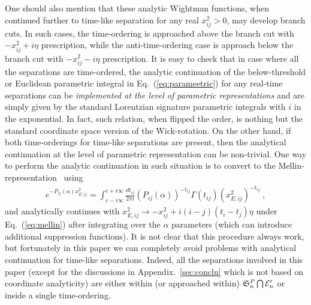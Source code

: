 \documentclass[a4paper,11pt]{article}
\begin{document}
One should also mention that these analytic Wightman functions, when continued further to time-like separation for any real $x^2_{ij}>0$, may develop branch cuts. In such cases, the time-ordering is approached above the branch cut with $-x_{ij}^2+i\eta$ prescription, while the anti-time-ordering case is approach below the branch cut with $-x^2_{ij}-i\eta$ prescription. It is easy to check that in case where all the separations are time-ordered, the analytic continuation of the below-threshold or Euclidean parametric integral in Eq.~(\ref{eq:parameetric}) for any real-time separations can be {\it implemented at the level of parametric representations} and are simply given by the standard Lorentzian signature parametric integrals with $i$ in the exponential. In fact, such relation, when flipped the order, is nothing but the standard coordinate space version of the Wick-rotation. On the other hand, if both time-orderings for time-like separations are present, then the analytical continuation at the level of parametric representation can be non-trivial. One way to perform the analytic continuation in such situation is to convert to the Mellin-representation~\cite{Korchemsky:2019nzm} using
\begin{align}\label{eq:mellin}
e^{-P_{ij}(\alpha)x_{E,ij}^2}=\int_{c-i\infty}^{c+i\infty} \frac{dt_{ij}}{2\pi i}(P_{ij}(\alpha))^{-t_{ij}}\Gamma(t_{ij})(x_{E,ij}^2)^{-t_{ij}} \ ,
\end{align}
and analytically continues with $x_{E,ij}^2 \rightarrow -x_{ij}^2+i(i-j)(t_i-t_j)\eta $ under Eq.~(\ref{eq:mellin}) after integrating over the $\alpha$ parameters (which can introduce additional suppression functions). It is not clear that this procedure always work, but fortunately in this paper we can completely avoid problems with analytical continuation for time-like separations. Indeed, all the separations involved in this paper (except for the discussions in Appendix.~\ref{sec:conclu} which is not based on coordinate analyticity) are either within (or approached within) $\mathfrak{S}^P_n \bigcap {\cal E}_n'$ or inside a single time-ordering. 
\end{document}
